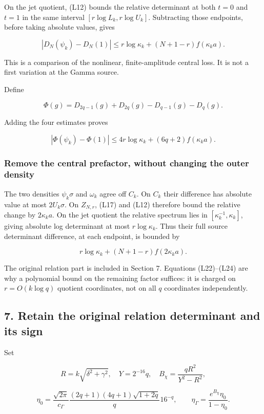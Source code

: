 On the jet quotient, (L12) bounds the relative determinant at both \(t=0\) and \(t=1\) in the same interval \([r\log L_k,r\log U_k]\). Subtracting those endpoints, before taking absolute values, gives

\[
\boxed{|D_N(\psi_k)-D_N(1)|
\le r\log\kappa_k+(N+1-r)f(\kappa_k a).}
\tag{L22}
\]

This is a comparison of the nonlinear, finite-amplitude central loss. It is not a first variation at the Gamma source.

Define

\[
\Phi(g)=D_{2q-1}(g)+D_{2q}(g)-D_{q-1}(g)-D_q(g).
\]

Adding the four estimates proves

\[
|\Phi(\psi_k)-\Phi(1)|
\le4r\log\kappa_k+(6q+2)f(\kappa_k a).
\tag{L23}
\]

\subsubsection{Remove the central prefactor, without changing the outer density}\label{remove-the-central-prefactor-without-changing-the-outer-density}

The two densities \(\psi_k\sigma\) and \(\omega_k\) agree off \(C_k\). On \(C_k\) their difference has absolute value at most \(2U_k\sigma\). On \(Z_{N,r}\), (L17) and (L12) therefore bound the relative change by \(2\kappa_k a\). On the jet quotient the relative spectrum lies in \([\kappa_k^{-1},\kappa_k]\), giving absolute log determinant at most \(r\log\kappa_k\). Thus their full source determinant difference, at each endpoint, is bounded by

\[
r\log\kappa_k+(N+1-r)f(2\kappa_k a).
\tag{L24}
\]

The original relation part is included in Section 7. Equations (L22)--(L24) are why a polynomial bound on the remaining factor suffices: it is charged on \(r=O(k\log q)\) quotient coordinates, not on all \(q\) coordinates independently.

\subsection{7. Retain the original relation determinant and its sign}\label{retain-the-original-relation-determinant-and-its-sign}

Set

\[
R=k\sqrt{\delta^2+\gamma^2},\quad Y=2^{-16}q,\quad
B_\chi=\frac{qR^2}{Y^2-R^2},
\]

\[
\eta_0=\frac{\sqrt{2\pi}}{c_\Gamma}
\frac{(2q+1)(4q+1)\sqrt{1+2q}}q16^{-q},\qquad
\eta_\Gamma=\frac{e^{B_\chi}\eta_0}{1-\eta_0}.
\tag{L25}
\]

